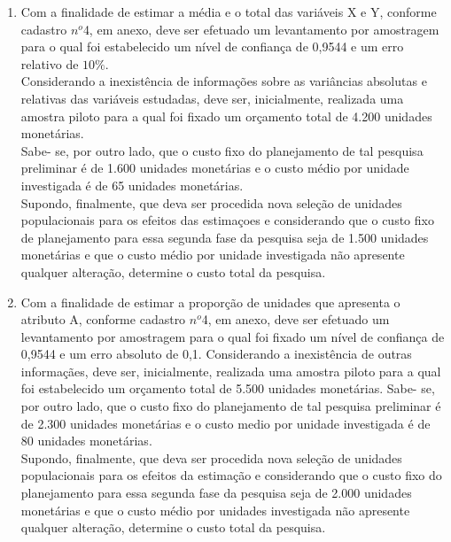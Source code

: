 \begin{enumerate}[resume]
\item Com a finalidade de estimar a média e o total das variáveis X e Y, conforme cadastro $n^o$4, em anexo, deve ser efetuado um levantamento por amostragem para o qual foi estabelecido um nível de confiança de 0,9544 e um erro relativo de $10\%$.\\
Considerando a inexistência de informações sobre as variâncias absolutas e relativas das variáveis estudadas, deve ser, inicialmente, realizada uma amostra piloto para a qual foi fixado um orçamento total de 4.200 unidades monetárias.\\
Sabe- se, por outro lado, que o custo fixo do planejamento de tal pesquisa preliminar é de 1.600 unidades monetárias e o custo médio por unidade investigada é de 65 unidades monetárias.\\
Supondo, finalmente, que deva ser procedida nova seleção de unidades populacionais para os efeitos das estimaçoes e considerando que o custo fixo de planejamento para essa segunda fase da pesquisa seja de 1.500 unidades monetárias e que o custo médio por unidade investigada não apresente qualquer alteração, determine o custo total da pesquisa.

\item Com a finalidade de estimar a proporção de unidades que apresenta o atributo A, conforme cadastro $n^o$4, em anexo, deve ser efetuado um levantamento por amostragem para o qual foi fixado um nível de confiança de 0,9544 e um erro absoluto
de 0,1. Considerando a inexistência de outras informaçães, deve ser, inicialmente, realizada uma amostra piloto para a qual foi estabelecido um orçamento total de 5.500 unidades monetárias. Sabe- se, por outro lado, que o custo fixo do planejamento de tal pesquisa preliminar é de 2.300 unidades monetárias e o custo medio por unidade investigada é de 80 unidades monetárias.\\
Supondo, finalmente, que deva ser procedida nova seleção de unidades populacionais para os efeitos da estimação e considerando que o custo fixo do planejamento para essa segunda fase da pesquisa seja de 2.000 unidades monetárias e que o custo médio por unidades investigada não apresente qualquer alteração, determine o custo total da pesquisa.


\end{enumerate}
